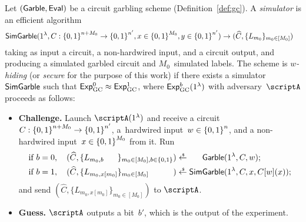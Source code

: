 \begin{definition}\label{def:gc-security}
Let $(\Garble,\Eval)$ be a circuit garbling scheme (Definition~\ref{def:gc}).
A \emph{simulator} is an efficient algorithm
\begin{align*}
\SimGarble&(1^\lambda,C:\bit^{n+M_0}\to\bit^{n'},x\in\bit^{M_0},y\in\bit^{n'})
\WideNarrow{\to}{\\{}\to{}&}
(\widehat{C},\{L_{m_0}\}_{m_0\in[M_0]})
\end{align*}
taking as input a circuit, a non-hardwired input, and a circuit output,
and producing a simulated garbled circuit and $M_0$~simulated labels.
The scheme is \emph{$w$-hiding} (or \emph{secure} for the purpose of this work) if there exists a simulator $\SimGarble$ such that ${\ExpGC{0}\approx\ExpGC{1}}$, where $\ExpGC{b}(1^\lambda)$ with adversary~$\scriptA$ proceeds as follows:
\begin{itemize}\upshape
\item\textbf{Challenge.}
Launch $\scriptA(1^\lambda)$ and receive
a circuit ${C:{\{0,1\}}^{n+M_0}\to{\{0,1\}}^{n'}}$,
a~hardwired input~${w\in{\{0,1\}}^n}$, and
a non-hardwired input~${x\in{\{0,1\}}^{M_0}}$
from it.
Run
\begin{align*}
\textup{if }b=0,\quad
(\widehat{C},\{L_{m_0,\mathrlap{b}\phantom{x[m_0]}}\}_{m_0\in[M_0],b\in\bit})
&{}\draws\phantom{\SimGarble}\mathllap{\Garble}(1^\lambda,C,w);\\
\textup{if }b=1,\quad
(\widehat{C},\{L_{m_0,x[m_0]}\}_{m_0\in[M_0]\phantom{,b\in\bit}})
&{}\draws\SimGarble(1^\lambda,C,x,C[w](x));
\end{align*}
and send $(\widehat{C},\{L_{m_0,x[m_0]}\}_{m_0\in[M_0]})$ to $\scriptA$.
\item\textbf{Guess.}
$\scriptA$ outputs a bit~$b'$, which is the output of the experiment.
\end{itemize}
\end{definition}
